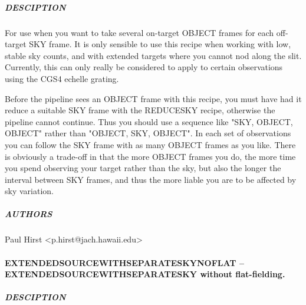 \documentclass[twoside,11pt]{article}
\renewcommand{\_}{\texttt{\symbol{95}}}
\begin{document}
\subparagraph*{DESCIPTION\label{EXTENDED_SOURCE_WITH_SEPARATE_SKY_--_For_extended_source_on_stable_sky_background__DESCIPTION}}

For use when you want to take several on-target OBJECT frames for each
off-target SKY frame. It is only sensible to use this recipe when
working with low, stable sky counts, and with extended targets where
you cannot nod along the slit. Currently, this can only really be
considered to apply to certain observations using the CGS4 echelle
grating.



Before the pipeline sees an OBJECT frame with this recipe, you must
have had it reduce a suitable SKY frame with the REDUCE\_SKY recipe,
otherwise the pipeline cannot continue. Thus you should use a sequence
like "SKY, OBJECT, OBJECT" rather than "OBJECT, SKY, OBJECT". In each
set of observations you can follow the SKY frame with as many OBJECT
frames as you like. There is obviously a trade-off in that the more
OBJECT frames you do, the more time you spend observing your target
rather than the sky, but also the longer the interval between SKY
frames, and thus the more liable you are to be affected by sky
variation.

\subparagraph*{AUTHORS\label{EXTENDED_SOURCE_WITH_SEPARATE_SKY_--_For_extended_source_on_stable_sky_background__AUTHORS}}

Paul Hirst <p.hirst@jach.hawaii.edu>

\paragraph*{EXTENDED\_SOURCE\_WITH\_SEPARATE\_SKY\_NOFLAT -- EXTENDED\_SOURCE\_WITH\_SEPARATE\_SKY without flat-fielding.\label{EXTENDED_SOURCE_WITH_SEPARATE_SKY_NOFLAT_--_EXTENDED_SOURCE_WITH_SEPARATE_SKY_without_flat-fielding_}}



\subparagraph*{DESCIPTION\label{EXTENDED_SOURCE_WITH_SEPARATE_SKY_NOFLAT_--_EXTENDED_SOURCE_WITH_SEPARATE_SKY_without_flat-fielding__DESCIPTION}}
\end{document}
